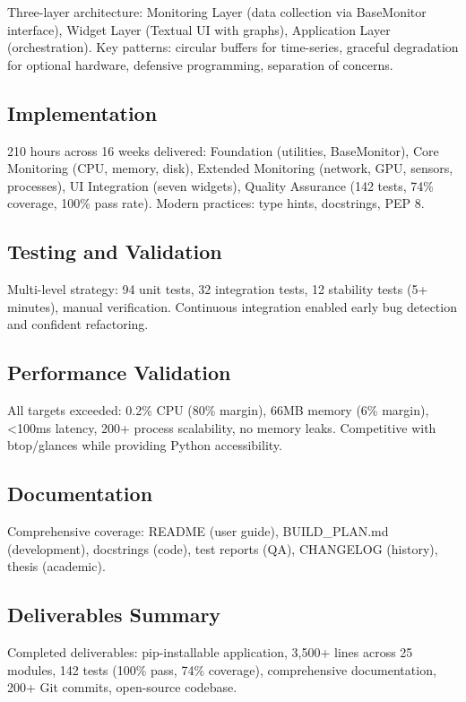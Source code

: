 \documentclass[12pt,a4paper,oneside]{report}
\begin{document}
Three-layer architecture: Monitoring Layer (data collection via BaseMonitor interface), Widget Layer (Textual UI with graphs), Application Layer (orchestration). Key patterns: circular buffers for time-series, graceful degradation for optional hardware, defensive programming, separation of concerns.

\subsection{Implementation}

210 hours across 16 weeks delivered: Foundation (utilities, BaseMonitor), Core Monitoring (CPU, memory, disk), Extended Monitoring (network, GPU, sensors, processes), UI Integration (seven widgets), Quality Assurance (142 tests, 74\% coverage, 100\% pass rate). Modern practices: type hints, docstrings, PEP 8.

\subsection{Testing and Validation}

Multi-level strategy: 94 unit tests, 32 integration tests, 12 stability tests (5+ minutes), manual verification. Continuous integration enabled early bug detection and confident refactoring.

\subsection{Performance Validation}

All targets exceeded: 0.2\% CPU (80\% margin), 66MB memory (6\% margin), <100ms latency, 200+ process scalability, no memory leaks. Competitive with btop/glances while providing Python accessibility.

\subsection{Documentation}

Comprehensive coverage: README (user guide), BUILD\_PLAN.md (development), docstrings (code), test reports (QA), CHANGELOG (history), thesis (academic).

\subsection{Deliverables Summary}

Completed deliverables: pip-installable application, 3,500+ lines across 25 modules, 142 tests (100\% pass, 74\% coverage), comprehensive documentation, 200+ Git commits, open-source codebase.
\end{document}
